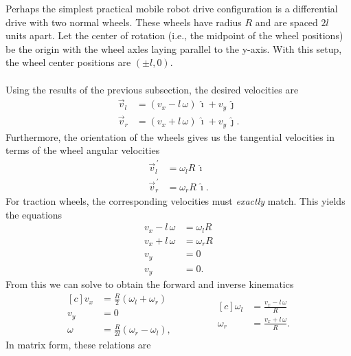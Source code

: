 \documentclass{article}
\newcommand{\pvec}[1]{\vec{#1}^{\,\prime}}
\begin{document}
Perhaps the simplest practical mobile robot drive configuration is a differential drive with two normal wheels. These wheels have radius $R$ and are spaced $2l$ units apart. Let the center of rotation (i.e., the midpoint of the wheel positions) be the origin with the wheel axles laying parallel to the y-axis. With this setup, the wheel center positions are \((\pm l, 0)\).\\
\\
Using the results of the previous subsection, the desired velocities are
\begin{align*}
    \vec{v}_l &= (v_x - l \, \omega) \, \hat{\imath} + v_y \, \hat{\jmath}\\
    \vec{v}_r &= (v_x + l \, \omega) \, \hat{\imath} + v_y \, \hat{\jmath}.
\end{align*}
Furthermore, the orientation of the wheels gives us the tangential velocities in terms of the wheel angular velocities
\begin{align*}
    \pvec{v}_l &= \omega_l R \, \hat{\imath}\\
    \pvec{v}_r &= \omega_r R \, \hat{\imath}.
\end{align*}
For traction wheels, the corresponding velocities must \textit{exactly} match. This yields the equations
\begin{align*}
    v_x - l \, \omega &= \omega_l R \\
    v_x + l \, \omega &= \omega_r R \\
    v_y &= 0 \\
    v_y &= 0.
\end{align*}
From this we can solve to obtain the forward and inverse kinematics
\begin{equation*}
    \begin{aligned}[c]
        v_x &= \frac{R}{2}(\omega_l + \omega_r) \\
        v_y &= 0 \\
        \omega &= \frac{R}{2l}(\omega_r - \omega_l),
    \end{aligned}
    \qquad\qquad
    \begin{aligned}[c]
        \omega_l &= \frac{v_x - l \, \omega}{R} \\
        \omega_r &= \frac{v_x + l \, \omega}{R}.
    \end{aligned}
\end{equation*}
In matrix form, these relations are
\end{document}
